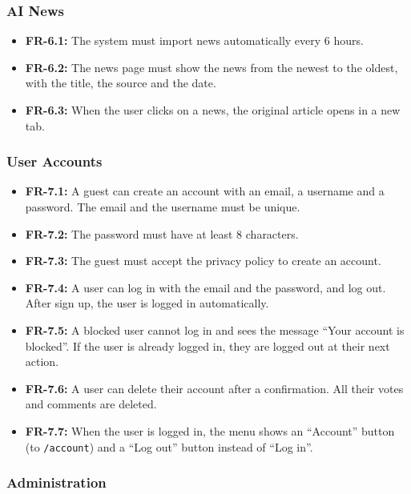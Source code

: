 \documentclass[11pt,a4paper]{article}
\begin{document}
\subsubsection{AI News}

\begin{itemize}
  \item \textbf{FR-6.1:} The system must import news automatically every 6 hours.
  \item \textbf{FR-6.2:} The news page must show the news from the newest to the oldest, with the title, the source and the date.
  \item \textbf{FR-6.3:} When the user clicks on a news, the original article opens in a new tab.
\end{itemize}

\subsubsection{User Accounts}

\begin{itemize}
  \item \textbf{FR-7.1:} A guest can create an account with an email, a username and a password. The email and the username must be unique.
  \item \textbf{FR-7.2:} The password must have at least 8 characters.
  \item \textbf{FR-7.3:} The guest must accept the privacy policy to create an account.
  \item \textbf{FR-7.4:} A user can log in with the email and the password, and log out. After sign up, the user is logged in automatically.
  \item \textbf{FR-7.5:} A blocked user cannot log in and sees the message ``Your account is blocked''. If the user is already logged in, they are logged out at their next action.
  \item \textbf{FR-7.6:} A user can delete their account after a confirmation. All their votes and comments are deleted.
  \item \textbf{FR-7.7:} When the user is logged in, the menu shows an ``Account'' button (to \texttt{/account}) and a ``Log out'' button instead of ``Log in''.
\end{itemize}

\subsubsection{Administration}
\end{document}
